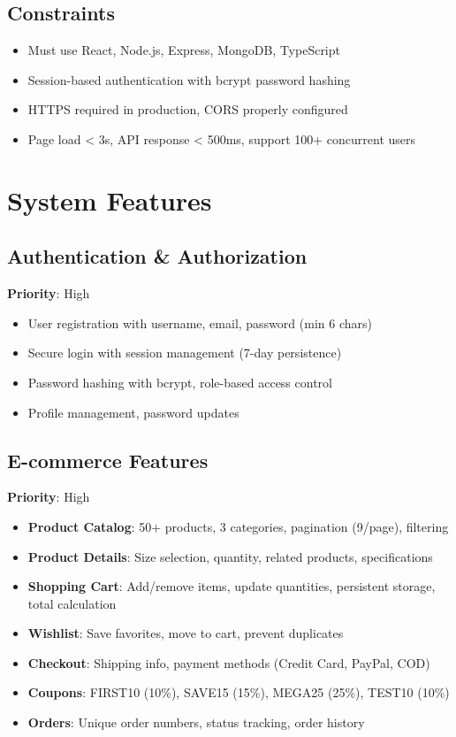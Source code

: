 \documentclass[11pt]{scrreprt}
\begin{document}
\section{Constraints}
\begin{itemize}
\item Must use React, Node.js, Express, MongoDB, TypeScript
\item Session-based authentication with bcrypt password hashing
\item HTTPS required in production, CORS properly configured
\item Page load < 3s, API response < 500ms, support 100+ concurrent users
\end{itemize}

\chapter{System Features}

\section{Authentication \& Authorization}
\textbf{Priority}: High
\begin{itemize}
\item User registration with username, email, password (min 6 chars)
\item Secure login with session management (7-day persistence)
\item Password hashing with bcrypt, role-based access control
\item Profile management, password updates
\end{itemize}

\section{E-commerce Features}
\textbf{Priority}: High
\begin{itemize}
\item \textbf{Product Catalog}: 50+ products, 3 categories, pagination (9/page), filtering
\item \textbf{Product Details}: Size selection, quantity, related products, specifications
\item \textbf{Shopping Cart}: Add/remove items, update quantities, persistent storage, total calculation
\item \textbf{Wishlist}: Save favorites, move to cart, prevent duplicates
\item \textbf{Checkout}: Shipping info, payment methods (Credit Card, PayPal, COD)
\item \textbf{Coupons}: FIRST10 (10\%), SAVE15 (15\%), MEGA25 (25\%), TEST10 (10\%)
\item \textbf{Orders}: Unique order numbers, status tracking, order history
\end{itemize}
\end{document}

